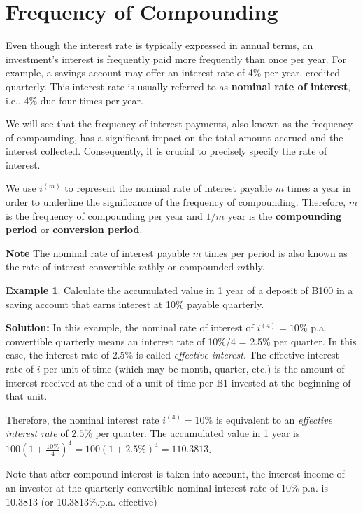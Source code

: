 \documentclass[
]{book}
\theoremstyle{definition}
\theoremstyle{definition}
\newtheorem{example}{Example}[chapter]
\theoremstyle{definition}
\theoremstyle{definition}
\theoremstyle{remark}
\begin{document}
\section{Frequency of Compounding}\label{frequency-of-compounding}

Even though the interest rate is typically expressed in annual terms, an investment's interest is frequently paid more frequently than once per year. For example, a savings account may offer an interest rate of 4\% per year, credited quarterly. This interest rate is usually referred to as \textbf{nominal rate of interest}, i.e., 4\% due four times per year.

We will see that the frequency of interest payments, also known as the frequency of compounding, has a significant impact on the total amount accrued and the interest collected. Consequently, it is crucial to precisely specify the rate of interest.

We use \(i^{(m)}\) to represent the nominal rate of interest payable \(m\) times a year in order to underline the significance of the frequency of compounding. Therefore, \(m\) is the
frequency of compounding per year and \(1/m\) year is the \textbf{compounding period} or \textbf{conversion period}.

\textbf{Note} The nominal rate of interest payable \(m\) times per period is also known as the rate of interest convertible \(m\)thly or compounded \(m\)thly.

\begin{example}
Calculate the accumulated value in 1 year of a deposit of ฿100 in a saving account that earns interest at 10\% payable quarterly.
\end{example}

\textbf{Solution:} In this example, the nominal rate of interest of \(i^{(4)} = 10\%\) p.a. convertible
quarterly means an interest rate of 10\%/4 = 2.5\% per quarter. In this case, the interest rate of 2.5\% is called \emph{effective interest}. The effective interest rate of \(i\) per unit of time (which may be month, quarter, etc.) is the amount of interest received at the end of a unit of time per ฿1 invested at the beginning of that unit.

Therefore, the nominal interest rate \(i^{(4)} = 10\%\) is equivalent to an
\emph{effective interest rate} of \(2.5\%\) per quarter.
The accumulated value in
1 year is \(100 (1 + \frac{10\%}{4})^4 = 100 (1 + 2.5\%)^4 = 110.3813\).

Note that after compound interest is
taken into account, the interest income of an investor at the quarterly
convertible nominal interest rate of 10\% p.a. is 10.3813 (or 10.3813\%.p.a. effective)
\end{document}
